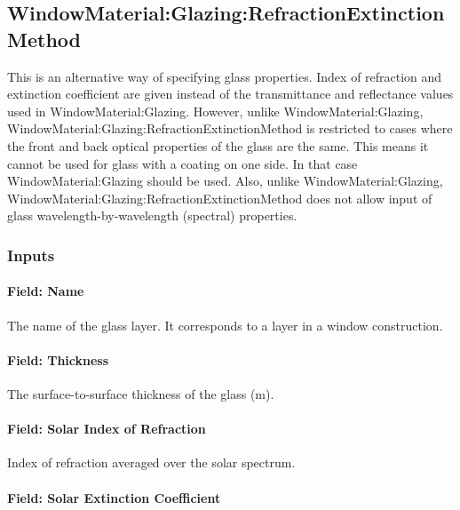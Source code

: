 \subsection{WindowMaterial:Glazing:RefractionExtinctionMethod}\label{windowmaterialglazingrefractionextinctionmethod}

This is an alternative way of specifying glass properties. Index of refraction and extinction coefficient are given instead of the transmittance and reflectance values used in WindowMaterial:Glazing. However, unlike WindowMaterial:Glazing, WindowMaterial:Glazing:RefractionExtinctionMethod is restricted to cases where the front and back optical properties of the glass are the same. This means it cannot be used for glass with a coating on one side. In that case WindowMaterial:Glazing should be used. Also, unlike WindowMaterial:Glazing, WindowMaterial:Glazing:RefractionExtinctionMethod does not allow input of glass wavelength-by-wavelength (spectral) properties.

\subsubsection{Inputs}\label{inputs-14-015}

\paragraph{Field: Name}\label{field-name-8-020}

The name of the glass layer. It corresponds to a layer in a window construction.

\paragraph{Field: Thickness}\label{field-thickness-2}

The surface-to-surface thickness of the glass (m).

\paragraph{Field: Solar Index of Refraction}\label{field-solar-index-of-refraction}

Index of refraction averaged over the solar spectrum.

\paragraph{Field: Solar Extinction Coefficient}\label{field-solar-extinction-coefficient}

